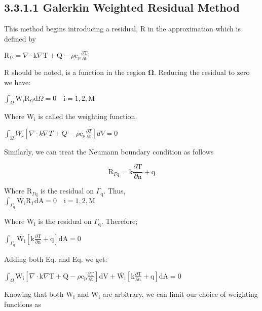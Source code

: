 \documentclass[10pt]{article}
\begin{document}
\subsection*{3.3.1.1 Galerkin Weighted Residual Method}
This method begins introducing a residual, $\mathrm{R}$ in the approximation which is defined by

$\mathrm{R}_{\Omega}=\nabla \cdot \mathrm{k} \nabla \mathrm{T}+\mathrm{Q}-\rho \mathrm{c}_{\mathrm{p}} \frac{\partial \mathrm{T}}{\partial \mathrm{t}}$

$\mathrm{R}$ should be noted, is a function in the region $\boldsymbol{\Omega}$. Reducing the residual to zero we have:

$\int_{\Omega} \mathrm{W}_{\mathrm{i}} \mathrm{R}_{\Omega} \mathrm{d} \Omega=0 \quad \mathrm{i}=1,2, \mathrm{M}$

Where $\mathrm{W}_{\mathrm{i}}$ is called the weighting function.

$\int_{\Omega} W_{i}\left[\nabla \cdot k \nabla T+Q-\rho c_{p} \frac{\partial T}{\partial t}\right] d V=0$

Similarly, we can treat the Neumann boundary condition as follows


\begin{equation*}
\mathrm{R}_{\Gamma \mathrm{q}}=\mathrm{k} \frac{\partial \mathrm{T}}{\partial \mathrm{n}}+\mathrm{q} \tag{11}
\end{equation*}


Where $\mathrm{R}_{\Gamma \mathrm{q}}$ is the residual on $\Gamma_{\mathrm{q}}$. Thus,\\
$\int_{\Gamma_{\mathrm{q}}} \overline{\mathrm{W}_{\mathrm{i}}} \mathrm{R}_{\Gamma} \mathrm{dA}=0 \quad \mathrm{i}=1,2, \mathrm{M}$

Where $\overline{\mathrm{W}}_{\mathrm{i}}$ is the residual on $\Gamma_{\mathrm{q}}$. Therefore;

$\int_{\Gamma_{\mathrm{q}}} \overline{\mathrm{W}_{\mathrm{i}}}\left[\mathrm{k} \frac{\partial \mathrm{T}}{\partial \mathrm{n}}+\mathrm{q}\right] \mathrm{dA}=0$

Adding both Eq. and Eq. we get:

$\int_{\Omega} \mathrm{W}_{\mathrm{i}}\left[\nabla \cdot \mathrm{k} \nabla \mathrm{T}+\mathrm{Q}-\rho \mathrm{c}_{\mathrm{p}} \frac{\partial \mathrm{T}}{\partial \mathrm{t}}\right] \mathrm{dV}+\overline{\mathrm{W}_{\mathrm{i}}}\left[\mathrm{k} \frac{\partial \mathrm{T}}{\partial \mathrm{n}}+\mathrm{q}\right] \mathrm{dA}=0$

Knowing that both $\mathrm{W}_{\mathrm{i}}$ and $\overline{\mathrm{W}}_{\mathrm{i}}$ are arbitrary, we can limit our choice of weighting functions as
\end{document}

